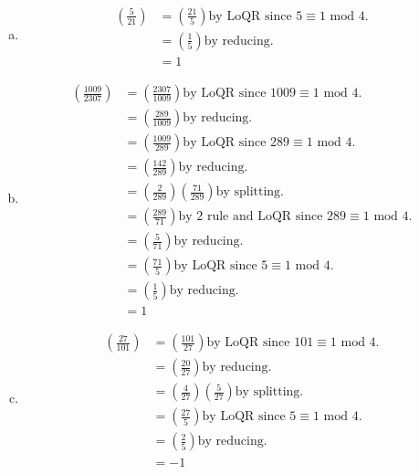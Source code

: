 \documentclass[class=article, crop=false]{standalone}
\def\leg#1#2{\left(\frac{#1}{#2}\right)}
\begin{document}
\subsubsection{}
\begin{enumerate}[(a)]
  \item
    \begin{align*}
      \leg{5}{21} &= \leg{21}{5} \text{by LoQR since } 5\equiv 1\mbox{ mod }4. \\
      &= \leg{1}{5} \text{by reducing.} \\
      &= 1
    \end{align*}

  \item
    \begin{align*}
      \leg{1009}{2307} &= \leg{2307}{1009} \text{by LoQR since } 1009\equiv 1\mbox{ mod }4. \\
      &= \leg{289}{1009} \text{by reducing.} \\
      &= \leg{1009}{289} \text{by LoQR since } 289\equiv 1 \mbox{ mod }4. \\
      &= \leg{142}{289} \text{by reducing.} \\
      &= \leg{2}{289}\leg{71}{289} \text{by splitting.} \\
      &= \leg{289}{71} \text{by 2 rule and LoQR since }289\equiv 1\mbox{ mod }4. \\
      &= \leg{5}{71} \text{by reducing.} \\
      &= \leg{71}{5} \text{by LoQR since }5\equiv 1\mbox{ mod }4. \\
      &= \leg{1}{5} \text{by reducing.} \\
      &= 1
    \end{align*}

  \item
    \begin{align*}
      \leg{27}{101} &= \leg{101}{27} \text{by LoQR since }101\equiv 1\mbox{ mod }4. \\
      &= \leg{20}{27} \text{by reducing.} \\
      &= \leg{4}{27}\leg{5}{27} \text{by splitting.} \\
      &= \leg{27}{5} \text{by LoQR since }5\equiv 1\mbox{ mod }4. \\
      &= \leg{2}{5} \text{by reducing.} \\
      &= -1
    \end{align*}
  \end{enumerate}
\end{document}
